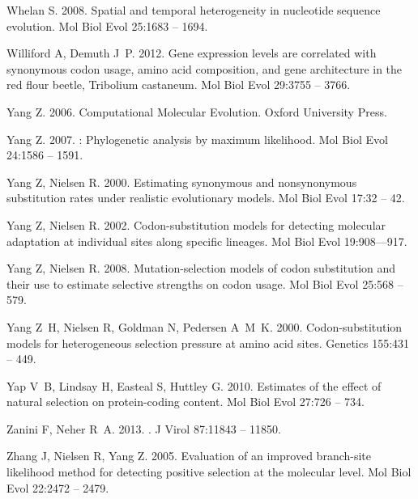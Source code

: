 \documentclass[11pt]{article}
\begin{document}
\begin{thebibliography}{79}
Whelan S. 2008.
\newblock Spatial and temporal heterogeneity in nucleotide sequence evolution.
\newblock Mol Biol Evol 25:1683 -- 1694.

Williford A, Demuth J~P. 2012.
\newblock Gene expression levels are correlated with synonymous codon usage,
  amino acid composition, and gene architecture in the red flour beetle,
  {Tribolium castaneum}.
\newblock Mol Biol Evol 29:3755 -- 3766.

Yang Z. 2006.
\newblock Computational Molecular Evolution.
\newblock Oxford University Press.

Yang Z. 2007.
: Phylogenetic analysis by maximum likelihood.
\newblock Mol Biol Evol 24:1586 -- 1591.

Yang Z, Nielsen R. 2000.
\newblock Estimating synonymous and nonsynonymous substitution rates under
  realistic evolutionary models.
\newblock Mol Biol Evol 17:32 -- 42.

Yang Z, Nielsen R. 2002.
\newblock Codon-substitution models for detecting molecular adaptation at
  individual sites along specific lineages.
\newblock Mol Biol Evol 19:908–--917.

Yang Z, Nielsen R. 2008.
\newblock Mutation-selection models of codon substitution and their use to
  estimate selective strengths on codon usage.
\newblock Mol Biol Evol 25:568 -- 579.

Yang Z~H, Nielsen R, Goldman N, Pedersen A~M~K. 2000.
\newblock Codon-substitution models for heterogeneous selection pressure at
  amino acid sites.
\newblock Genetics 155:431 -- 449.

Yap V~B, Lindsay H, Easteal S, Huttley G. 2010.
\newblock Estimates of the effect of natural selection on protein-coding
  content.
\newblock Mol Biol Evol 27:726 -- 734.

Zanini F, Neher R~A. 2013.
.
\newblock J Virol 87:11843 -- 11850.

Zhang J, Nielsen R, Yang Z. 2005.
\newblock Evaluation of an improved branch-site likelihood method for detecting
  positive selection at the molecular level.
\newblock Mol Biol Evol 22:2472 -- 2479.


\end{thebibliography}
\end{document}
